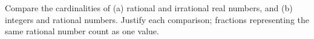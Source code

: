 Compare the cardinalities of (a) rational and irrational real numbers, and (b) integers and rational numbers. Justify each comparison; fractions representing the same rational number count as one value.
